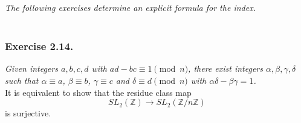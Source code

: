 \documentclass{article}
\begin{document}
\emph{The following exercises determine an explicit formula for the index.} \\\\



\subsubsection*{Exercise 2.14.}
\emph{Given integers $a, b, c, d$ with $ad - bc \equiv 1 \pmod{n}$,
there exist integers $\alpha, \beta, \gamma, \delta$ such that
$\alpha \equiv a$, $\beta \equiv b$, $\gamma \equiv c$ and $\delta \equiv d \pmod{n}$
with $\alpha\delta - \beta\gamma = 1$.} \\

It is equivalent to show that the residue class map
\[
  SL_2(\mathbb{Z}) \to SL_2(\mathbb{Z}/n\mathbb{Z})
\]
is surjective. \\
\end{document}

